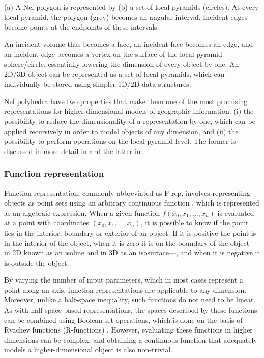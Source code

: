 {\caption[A Nef polygon represented by a set of local pyramids]{(a) A Nef polygon is represented by (b) a set of local pyramids (circles). At every local pyramid, the polygon (grey) becomes an angular interval. Incident edges become points at the endpoints of these intervals.}
\label{fig:nef}
}
An incident volume thus becomes a face, an incident face becomes an edge, and an incident edge becomes a vertex on the surface of the local pyramid sphere/circle, essentially lowering the dimension of every object by one.
An 2D/3D object can be represented as a set of local pyramids, which can individually be stored using simpler 1D/2D data structures.

Nef polyhedra have two properties that make them one of the most promising representations for higher-dimensional models of geographic information: (i) the possibility to reduce the dimensionality of a representation by one, which can be applied recursively in order to model objects of any dimension, and (ii) the possibility to perform operations on the local pyramid level.
The former is discussed in more detail in  and the latter in .

\subsubsection{Function representation}

Function representation, commonly abbreviated as F-rep, involves representing objects as point sets using an arbitrary continuous function \citep{Pasko95}, which is represented as an algebraic expression.
When a given function $f(x_0, x_1, \ldots, x_n)$ is evaluated at a point with coordinates $(x_0, x_1, \ldots, x_n)$, it is possible to know if the point lies in the interior, boundary or exterior of an object.
If it is positive the point is in the interior of the object, when it is zero it is on the boundary of the object---in 2D known as an isoline and in 3D as an isosurface---, and when it is negative it is outside the object.

By varying the number of input parameters, which in most cases represent a point along an axis, function representations are applicable to any dimension.
Moreover, unlike a half-space inequality, such functions do not need to be linear.
As with half-space based representations, the spaces described by these functions can be combined using Boolean set operations, which is done on the basis of Rvachev functions (R-functions) \citep{Rvachev63}.
However, evaluating these functions in higher dimensions can be complex, and obtaining a continuous function that adequately models a higher-dimensional object is also non-trivial.

